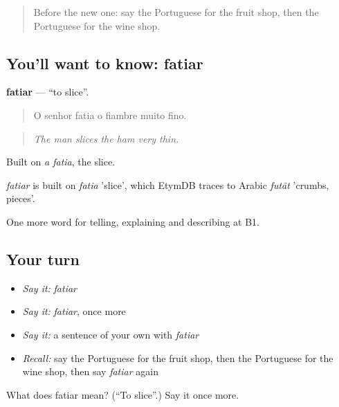 \label{lesson:PT-C450-fatiar}



\begin{quote}
Before the new one: say the Portuguese for the fruit shop, then the Portuguese for the wine shop.
\end{quote}

\subsection*{You'll want to know: fatiar}
\textbf{fatiar} — \textquotedblleft{}to slice\textquotedblright{}.

\begin{quote}
O senhor fatia o fiambre muito fino.
\end{quote}

\begin{quote}
\emph{The man slices the ham very thin.}
\end{quote}

Built on \emph{a fatia}, the slice.

\begin{cousinweb}
\emph{fatiar} is built on \emph{fatia} 'slice', which EtymDB traces to Arabic \emph{futāt} 'crumbs, pieces'.
\end{cousinweb}

\begin{grammarlens}[title={What you've built}]
One more word for telling, explaining and describing at B1.
\end{grammarlens}

\subsection*{Your turn}
\begin{itemize}
\raggedright
  \item \emph{Say it:} \emph{fatiar}
  \item \emph{Say it:} \emph{fatiar}, once more
  \item \emph{Say it:} a sentence of your own with \emph{fatiar}
  \item \emph{Recall:} say the Portuguese for the fruit shop, then the Portuguese for the wine shop, then say \emph{fatiar} again
\end{itemize}

\begin{tcolorbox}[breakable,colback=teal!4,colframe=teal!35!black,title={Before you move on}]
What does fatiar mean? (\textquotedblleft{}To slice\textquotedblright{}.) Say it once more.
\end{tcolorbox}
